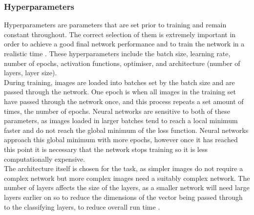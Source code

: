 \documentclass[12pt, onecolumn]{aa}
\begin{document}
\subsubsection{Hyperparameters} \label{sec:hyperdeep}
Hyperparameters are parameters that are set prior to training and remain constant throughout. The correct selection of them is extremely important in order to achieve a good final network performance and to train the network in a realistic time \citep{SmithHyperparameters}. These hyperparameters include the batch size, learning rate, number of epochs, activation functions, optimiser, and architecture (number of layers, layer size).\\

During training, images are loaded into batches set by the batch size and are passed through the network. One epoch is when all images in the training set have passed through the network once, and this process repeats a set amount of times, the number of epochs. Neural networks are sensitive to both of these parameters, as images loaded in larger batches tend to reach a local minimum faster and do not reach the global minimum of the loss function. Neural networks approach this global minimum with more epochs, however once it has reached this point it is necessary that the network stops training so it is less computationally expensive.\\

The architecture itself is chosen for the task, as simpler images do not require a complex network but more complex images need a suitably complex network. The number of layers affects the size of the layers, as a smaller network will need large layers earlier on so to reduce the dimensions of the vector being passed through to the classifying layers, to reduce overall run time \citep{Goodfellow-et-al-2016}.\\
\end{document}
